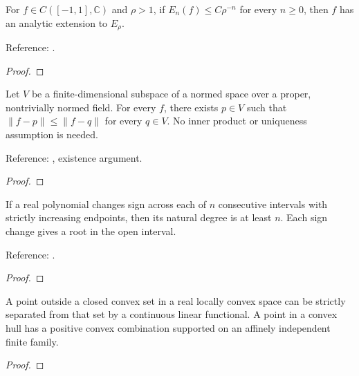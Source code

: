 \begin{supporting}

\begin{theorem}
\label{thm:best-error-bernstein-converse}
\leanok
For $f\in C([-1,1],\mathbb C)$ and $\rho>1$, if $E_n(f)\le C\rho^{-n}$
for every $n\ge0$, then $f$ has an analytic extension to $E_\rho$.

Reference: \cite[Theorem 8.3]{atap}.
\end{theorem}
\begin{proof}
\leanok
\end{proof}

\begin{theorem}
\label{thm:finite-dimensional-best-approximation}
\leanok
Let $V$ be a finite-dimensional subspace of a normed space over a proper,
nontrivially normed field. For every $f$, there exists $p\in V$ such that
$\|f-p\|\le\|f-q\|$ for every $q\in V$. No inner product or uniqueness
assumption is needed.

Reference: \cite[Theorem 10.1]{atap}, existence argument.
\end{theorem}
\begin{proof}
\leanok
\end{proof}

\begin{theorem}
\label{thm:alternation-root-count}
\leanok
If a real polynomial changes sign across each of $n$ consecutive intervals
with strictly increasing endpoints, then its natural degree is at least $n$.
Each sign change gives a root in the open interval.

Reference: \cite[proof of Theorem 10.1]{atap}.
\end{theorem}
\begin{proof}
\leanok
\end{proof}

\begin{theorem}
\label{thm:mathlib-convex-certificates}
\mathlibok
A point outside a closed convex set in a real locally convex space can be
strictly separated from that set by a continuous linear functional.
A point in a convex hull has a positive convex combination supported on an
affinely independent finite family.
\end{theorem}
\begin{proof}
\mathlibok
\end{proof}


\end{supporting}
